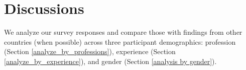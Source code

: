 \section{Discussions}
\label{discussions}
We analyze our survey responses and compare those with findings from other countries (when possible) across  three participant demographics: profession (Section \ref{analyze_by_professions}), 
experience (Section \ref{analyze_by_experience}), and gender (Section \ref{analysis by gender}). 






% 
